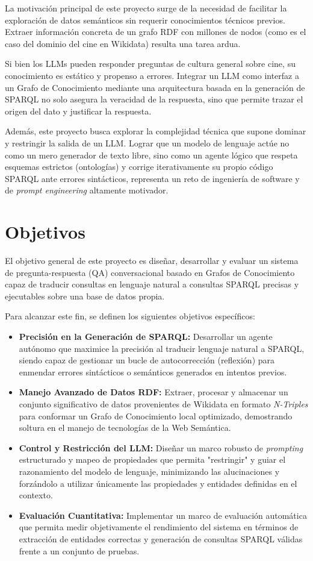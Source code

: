 La motivación principal de este proyecto surge de la necesidad de facilitar la exploración de datos semánticos sin requerir conocimientos técnicos previos. Extraer información concreta de un grafo RDF con millones de nodos (como es el caso del dominio del cine en Wikidata) resulta una tarea ardua. 

Si bien los LLMs pueden responder preguntas de cultura general sobre cine, su conocimiento es estático y propenso a errores. Integrar un LLM como interfaz a un Grafo de Conocimiento mediante una arquitectura basada en la generación de SPARQL no solo asegura la veracidad de la respuesta, sino que permite trazar el origen del dato y justificar la respuesta.

Además, este proyecto busca explorar la complejidad técnica que supone dominar y restringir la salida de un LLM. Lograr que un modelo de lenguaje actúe no como un mero generador de texto libre, sino como un agente lógico que respeta esquemas estrictos (ontologías) y corrige iterativamente su propio código SPARQL ante errores sintácticos, representa un reto de ingeniería de software y de \textit{prompt engineering} altamente motivador.

\section{Objetivos}

El objetivo general de este proyecto es diseñar, desarrollar y evaluar un sistema de pregunta-respuesta (QA) conversacional basado en Grafos de Conocimiento capaz de traducir consultas en lenguaje natural a consultas SPARQL precisas y ejecutables sobre una base de datos propia.

Para alcanzar este fin, se definen los siguientes objetivos específicos:

\begin{itemize}
    \item \textbf{Precisión en la Generación de SPARQL:} Desarrollar un agente autónomo que maximice la precisión al traducir lenguaje natural a SPARQL, siendo capaz de gestionar un bucle de autocorrección (reflexión) para enmendar errores sintácticos o semánticos generados en intentos previos.
    \item \textbf{Manejo Avanzado de Datos RDF:} Extraer, procesar y almacenar un conjunto significativo de datos provenientes de Wikidata en formato \textit{N-Triples} para conformar un Grafo de Conocimiento local optimizado, demostrando soltura en el manejo de tecnologías de la Web Semántica.
    \item \textbf{Control y Restricción del LLM:} Diseñar un marco robusto de \textit{prompting} estructurado y mapeo de propiedades que permita "restringir" y guiar el razonamiento del modelo de lenguaje, minimizando las alucinaciones y forzándolo a utilizar únicamente las propiedades y entidades definidas en el contexto.
    \item \textbf{Evaluación Cuantitativa:} Implementar un marco de evaluación automática que permita medir objetivamente el rendimiento del sistema en términos de extracción de entidades correctas y generación de consultas SPARQL válidas frente a un conjunto de pruebas.
\end{itemize}

